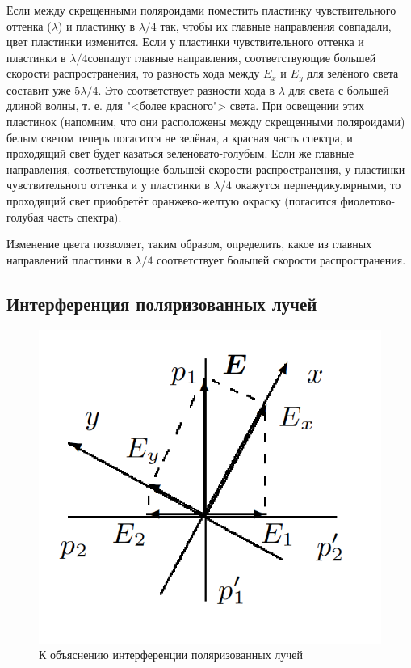 \documentclass[a4paper,12pt]{article}
\begin{document}
Если между скрещенными поляроидами поместить пластинку чувствительного оттенка
($ \lambda $) и пластинку в $ \lambda/4 $ так, чтобы их главные
направления совпадали, цвет пластинки изменится. Если у пластинки чувствительного оттенка и пластинки в $ \lambda/4  $совпадут главные направления, соответствующие большей скорости распространения, то разность хода между $ E_x $ и $ E_y $ для зелёного света составит уже $ 5\lambda/4 $. Это соответствует разности хода в $ \lambda $ для света с большей длиной волны, т. е. для "<более красного"> света. При освещении
этих пластинок (напомним, что они расположены между скрещенными поляроидами) белым светом теперь погасится не зелёная, а красная
часть спектра, и проходящий свет будет казаться зеленовато-голубым.
Если же главные направления, соответствующие большей скорости распространения, у пластинки чувствительного оттенка и у пластинки
в $ \lambda/4 $ окажутся перпендикулярными, то проходящий свет приобретёт
оранжево-желтую окраску (погасится фиолетово-голубая часть спектра).

Изменение цвета позволяет, таким образом, определить, какое из
главных направлений пластинки в $ \lambda/4 $ соответствует большей скорости
распространения.

\subsection{Интерференция поляризованных лучей}


\begin{figure}[h!]
    \centering
    \includegraphics[scale = 0.4]{4.png}
    \caption{К объяснению интерференции поляризованных лучей}
    \label{fig : 1}
\end{figure}
\end{document}
